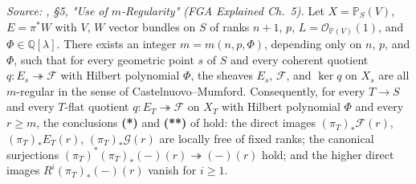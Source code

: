 \begin{lemma}
  \label{lem:quot_boundedness}

  \textit{Source: \cite{nitsure-hilbert-quot}, \S 5, "Use of \(m\)-Regularity" (FGA Explained
  Ch.~5).}
  Let \(X = \mathbb{P}_S(V)\), \(E = \pi^* W\) with \(V\), \(W\) vector bundles on
  \(S\) of ranks \(n+1\), \(p\), \(L = \mathcal{O}_{\mathbb{P}(V)}(1)\), and
  \(\Phi \in \mathbb{Q}[\lambda]\). There exists an integer
  \(m = m(n, p, \Phi)\), depending only on \(n\), \(p\), and \(\Phi\), such that
  for every geometric point \(s\) of \(S\) and every coherent quotient
  \(q : E_s \twoheadrightarrow \mathcal{F}\) with Hilbert polynomial
  \(\Phi\), the sheaves \(E_s\), \(\mathcal{F}\), and \(\ker q\) on \(X_s\) are all
  \(m\)-regular in the sense of Castelnuovo--Mumford. Consequently, for
  every \(T \to S\) and every \(T\)-flat quotient
  \(q : E_T \twoheadrightarrow \mathcal{F}\) on \(X_T\) with Hilbert
  polynomial \(\Phi\) and every \(r \ge m\), the conclusions \textbf{(*)} and
  \textbf{(**)} of \cite[\S 5, ``Use of \(m\)-Regularity'']{nitsure-hilbert-quot}
  hold: the direct images \((\pi_T)_* \mathcal{F}(r)\), \((\pi_T)_* E_T(r)\),
  \((\pi_T)_* \mathcal{G}(r)\) are locally free of fixed ranks; the
  canonical surjections \((\pi_T)^* (\pi_T)_*(-)(r) \twoheadrightarrow (-)(r)\)
  hold; and the higher direct images \(R^i (\pi_T)_* (-)(r)\) vanish for
  \(i \ge 1\).
\end{lemma}

